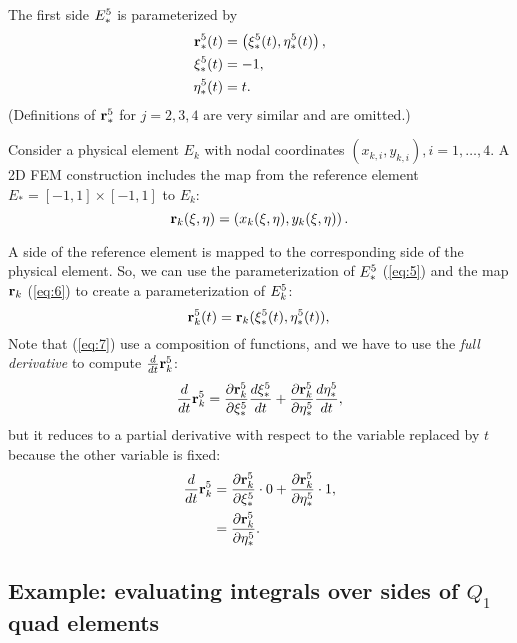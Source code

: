 \documentclass[11pt]{article}
\begin{document}
The first side $E_{*}^{5}$ is parameterized by
\begin{equation}
  \label{eq:5}
  \begin{aligned}
      \mathbf{r}_{*}^{5}(t) &= \left(\xi_{*}^{5}(t), \eta_{*}^{5}(t) \right),\\
      \xi_{*}^{5}(t) &= -1,\\
      \eta_{*}^{5}(t) &= t.
  \end{aligned}
\end{equation}
(Definitions of $\mathbf{r}_{*}^{5}$ for $j = 2, 3, 4$ are very similar and
are omitted.)

Consider a physical element $E_{k}$ with nodal coordinates $(x_{k,i}, y_{k,i}), i = 1,\dots,4$.
A 2D FEM construction includes the map from the reference element
$E_{*} = [-1, 1] \times [-1,1]$ to $E_{k}$:
\begin{equation}
\label{eq:6}
\mathbf{r}_{k}(\xi,\eta) = \left( x_{k}(\xi,\eta), y_{k}(\xi,\eta) \right).
\end{equation}

A side of the reference element is mapped to the corresponding side of
the physical element. So, we can use the parameterization of
$E_{*}^{5}$ (\ref{eq:5}) and the map $\mathbf{r}_{k}$ (\ref{eq:6}) to create a parameterization of
$E_{k}^{5}$:
\begin{equation}
  \label{eq:7}
  \mathbf{r}_{k}^{5}(t) = \mathbf{r}_{k}(\xi_{*}^{5}(t), \eta_{*}^{5}(t)),\\
\end{equation}
Note that (\ref{eq:7}) use a composition of functions, and we have to
use the \emph{full derivative} to compute $\frac{d}{dt}\mathbf{r}_{k}^{5}$:
\begin{equation}
  \label{eq:8}
  \frac{d }{d t}\mathbf{r}_{k}^{5} = \frac{\partial \mathbf{r}_{k}^{5}}{\partial \xi_{*}^{5}} \frac{d \xi_{*}^{5}}{d t} + \frac{\partial \mathbf{r}_{k}^{5}}{\partial \eta_{*}^{5}} \frac{d \eta_{*}^{5}}{d t},
\end{equation}
but it reduces to a partial derivative with respect to the variable
replaced by $t$ because the other variable is fixed:
\begin{equation}
  \label{eq:9}
  \begin{aligned}
  \frac{d }{d t}\mathbf{r}_{k}^{5} &= \frac{\partial \mathbf{r}_{k}^{5}}{\partial \xi_{*}^{5}}\cdot 0 + \frac{\partial \mathbf{r}_{k}^{5}}{\partial \eta_{*}^{5}} \cdot 1,\\
    &=\frac{\partial \mathbf{r}_{k}^{5}}{\partial \eta_{*}^{5}}.
  \end{aligned}
\end{equation}
\subsection{Example: evaluating integrals over sides of $Q_{1}$ quad elements}
\label{sec-3-1}
\end{document}
